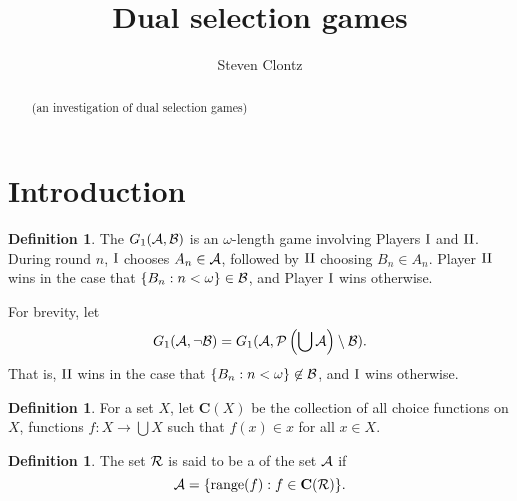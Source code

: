 \documentclass{amsart}
\theoremstyle{plain}
\theoremstyle{definition}
\newtheorem{definition}[theorem]{Definition}
\theoremstyle{remark}
\theoremstyle{plain}
\theoremstyle{definition}
\theoremstyle{remark}
\begin{document}
\title{Dual selection games}



\author{Steven Clontz}
\address{Department of Mathematics and Statistics,
The University of South Alabama,
Mobile, AL 36688}










\begin{abstract}
  (an investigation of dual selection games)
\end{abstract}


\maketitle







\section{Introduction}

\begin{definition}
  The  \(G_{1}(\mathcal{A},\mathcal{B})\) 
  is an \(\omega\)-length game involving Players \(\mathrm{I}\) and \(\mathrm{II}\). 
  During round \(n\), \(\mathrm{I}\) chooses
  \(A_n\in\mathcal{A}\), followed by \(\mathrm{II}\) choosing \(B_n\in A_n\).
  Player \(\mathrm{II}\) wins in the case that \(\{B_n:n<\omega\}\in\mathcal{B}\),
  and Player \(\mathrm{I}\) wins otherwise.
\end{definition}

  For brevity, let 
  \[
    G_{1}(\mathcal{A},\neg \mathcal{B})
      =
    G_{1}(\mathcal{A},\mathcal{P}\left(\bigcup \mathcal{A}\right)\setminus \mathcal{B})
  .\]
  That is, \(\mathrm{II}\) wins in the case that \(\{B_n:n<\omega\}\not\in\mathcal{B}\),
  and \(\mathrm{I}\) wins otherwise.

\begin{definition}
  For a set \(X\), let \(\mathbf C(X)\) be the collection of all
  choice functions on \(X\), functions \(f:X\to\bigcup X\) 
  such that \(f(x)\in x\) for all \(x\in X\).
\end{definition}

\begin{definition}
  The set \(\mathcal{R}\) is said to be a  of the set \(\mathcal{A}\)
  if \[\mathcal{A}= \{\text{range}(f):f\in\mathbf C(\mathcal{R})\}.\]
\end{definition}
\end{document}
